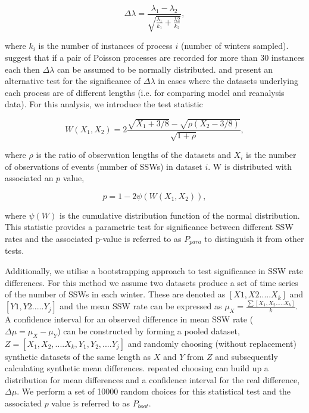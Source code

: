 \begin{equation} \label{Poisson}
\Delta\lambda = \frac{\lambda_1 - \lambda_2}{\sqrt{\frac{\lambda_1}{k_1} + \frac{\lambda2}{k_2}}},
\end{equation}

where $k_i$ is the number of instances of process $i$ (number of winters sampled). \cite{Charlton2007} suggest that if a pair of Poisson processes are recorded for more than 30 instances each then $\Delta\lambda$ can be assumed to be normally distributed. \cite{Gu} and \cite{Huffman} present an alternative test for the significance of $\Delta\lambda$ in cases where the datasets underlying each process are of different lengths (i.e. for comparing model and reanalysis data). For this analysis, we introduce the test statistic

\begin{equation} \label{deltalambda}
W(X_1, X_2) = 2 \frac{\sqrt{X_1 + 3/8} - \sqrt{\rho(X_2 - 3/8)}}
{\sqrt{1 + \rho}},
\end{equation}

where $\rho$ is the ratio of observation lengths of the datasets and $X_i$ is the number of observations of events (number of SSWs) in dataset $i$. W is distributed with associated an $p$ value, 

\begin{equation} \label{Pval}
p = 1-2\psi(W(X_1, X_2)),
\end{equation}

where $\psi(W)$ is the cumulative distribution function of the normal distribution. This statistic provides a parametric test for significance between different SSW rates and the associated p-value is referred to as $P_{para}$ to distinguish it from other tests. 

Additionally, we utilise a bootstrapping approach to test significance in SSW rate differences. For this method we assume two datasets produce a set of time series of the number of SSWs in each winter. These are denoted as $[X1,X2.....X_k]$ and $[Y1,Y2.....Y_j]$ and the mean SSW rate can be expressed as $\mu_X = \frac{\sum[X_1,X_2.....X_k]}{k}$. A confidence interval for an observed difference in mean SSW rate ($\Delta\mu = \mu_X - \mu_Y$) can be constructed by forming a pooled dataset, $Z = [X_1, X_2,....X_k,Y_1,Y_2,....Y_j]$ and randomly choosing (without replacement) synthetic datasets of the same length as $X$ and $Y$ from $Z$ and subsequently calculating synthetic mean differences. repeated choosing can build up a distribution for mean differences and a confidence interval for the real difference, $\Delta\mu$. We perform a set of 10000 random choices for this statistical test and the associated $p$ value is referred to as $P_{boot}$.


